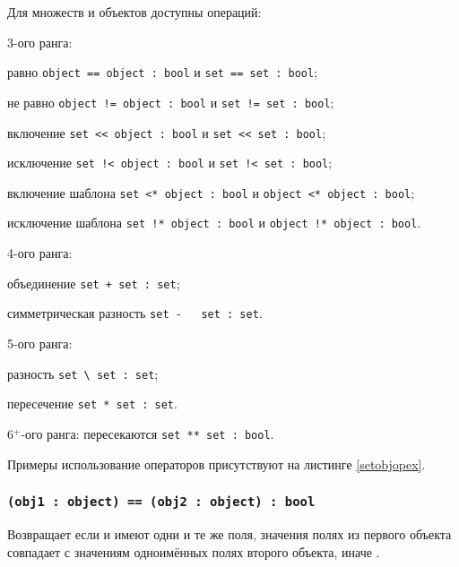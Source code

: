 Для множеств и объектов доступны операций:
\begin{icItems}
	\item
		3-ого ранга:
		\begin{icItems}
		\item
			равно \lstinline`object == object : bool` и \lstinline`set == set : bool`;
		\item
			не равно \lstinline`object != object : bool` и \lstinline`set != set : bool`;
		\item
			включение \lstinline`set << object : bool` и \lstinline|set << set : bool|;
		\item 
			исключение \lstinline`set !< object : bool` и \lstinline|set !< set : bool|;
		\item
			включение шаблона \lstinline`set <* object : bool` и \lstinline`object <* object : bool`;
		\item 
			исключение шаблона \lstinline`set !* object : bool` и \lstinline`object !* object : bool`.
		\end{icItems}
	\item
		4-ого ранга:
		\begin{icItems}
		\item
			объединение \lstinline`set + set : set`;
		\item
			симметрическая разность \lstinline`set -   set : set`.
		\end{icItems}
	\item
		5-ого ранга:
		\begin{icItems}
		\item
			разность \lstinline`set \ set : set`;
		\item
			пересечение \lstinline`set * set : set`.
		\end{icItems}
	\item
		6$^+$-ого ранга: пересекаются \lstinline|set ** set : bool|.
\end{icItems}

Примеры использование операторов присутствуют на листинге \ref{setobjopex}.

\subsubsection{\lstinline`(obj1 : object) == (obj2 : object) : bool`}

Возвращает \true{} если  и  имеют одни и те же поля, значения полях из первого объекта совпадает с значениям одноимённых полях второго объекта, иначе \false{}.

